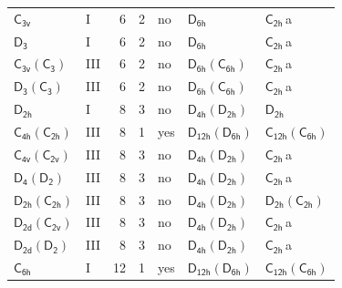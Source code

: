 \documentclass[10pt,a4paper]{article}
\numberwithin{equation}{section}
\newcommand{\grp}[1]{\mathsf{#1}}
\newcommand{\clsletter}[1]{\,{\scriptsize\color{black!55}#1}}
\begin{document}
{\begin{longtable}{@{}llrrlll@{}}
\href{../../../rotation/data/pdf/C3v.pdf}{$\grp{C_{3v}}$} & I & 6 & 2 & no & \href{../../../rotation/data/pdf/D6h.pdf}{$\grp{D_{6h}}$} & \href{../../../rotation/data/pdf/C2h.pdf}{$\grp{C_{2h}}$}\clsletter{a}\\
\href{../../../rotation/data/pdf/D3.pdf}{$\grp{D_{3}}$} & I & 6 & 2 & no & \href{../../../rotation/data/pdf/D6h.pdf}{$\grp{D_{6h}}$} & \href{../../../rotation/data/pdf/C2h.pdf}{$\grp{C_{2h}}$}\clsletter{a}\\
\href{C3v-C3.pdf}{$\grp{C_{3v}}(\grp{C_{3}})$} & III & 6 & 2 & no & \href{D6h-C6h.pdf}{$\grp{D_{6h}}(\grp{C_{6h}})$} & \href{../../../rotation/data/pdf/C2h.pdf}{$\grp{C_{2h}}$}\clsletter{a}\\
\href{D3-C3.pdf}{$\grp{D_{3}}(\grp{C_{3}})$} & III & 6 & 2 & no & \href{D6h-C6h.pdf}{$\grp{D_{6h}}(\grp{C_{6h}})$} & \href{../../../rotation/data/pdf/C2h.pdf}{$\grp{C_{2h}}$}\clsletter{a}\\
\href{../../../rotation/data/pdf/D2h.pdf}{$\grp{D_{2h}}$} & I & 8 & 3 & no & \href{D4h-D2h.pdf}{$\grp{D_{4h}}(\grp{D_{2h}})$} & \href{../../../rotation/data/pdf/D2h.pdf}{$\grp{D_{2h}}$}\\
\href{C4h-C2h.pdf}{$\grp{C_{4h}}(\grp{C_{2h}})$} & III & 8 & 1 & yes & \href{D12h-D6h.pdf}{$\grp{D_{12h}}(\grp{D_{6h}})$} & \href{C12h-C6h.pdf}{$\grp{C_{12h}}(\grp{C_{6h}})$}\\
\href{C4v-C2v.pdf}{$\grp{C_{4v}}(\grp{C_{2v}})$} & III & 8 & 3 & no & \href{D4h-D2h.pdf}{$\grp{D_{4h}}(\grp{D_{2h}})$} & \href{../../../rotation/data/pdf/C2h.pdf}{$\grp{C_{2h}}$}\clsletter{a}\\
\href{D4-D2.pdf}{$\grp{D_{4}}(\grp{D_{2}})$} & III & 8 & 3 & no & \href{D4h-D2h.pdf}{$\grp{D_{4h}}(\grp{D_{2h}})$} & \href{../../../rotation/data/pdf/C2h.pdf}{$\grp{C_{2h}}$}\clsletter{a}\\
\href{D2h-C2h.pdf}{$\grp{D_{2h}}(\grp{C_{2h}})$} & III & 8 & 3 & no & \href{D4h-D2h.pdf}{$\grp{D_{4h}}(\grp{D_{2h}})$} & \href{D2h-C2h.pdf}{$\grp{D_{2h}}(\grp{C_{2h}})$}\\
\href{D2d-C2v.pdf}{$\grp{D_{2d}}(\grp{C_{2v}})$} & III & 8 & 3 & no & \href{D4h-D2h.pdf}{$\grp{D_{4h}}(\grp{D_{2h}})$} & \href{../../../rotation/data/pdf/C2h.pdf}{$\grp{C_{2h}}$}\clsletter{a}\\
\href{D2d-D2.pdf}{$\grp{D_{2d}}(\grp{D_{2}})$} & III & 8 & 3 & no & \href{D4h-D2h.pdf}{$\grp{D_{4h}}(\grp{D_{2h}})$} & \href{../../../rotation/data/pdf/C2h.pdf}{$\grp{C_{2h}}$}\clsletter{a}\\
\href{../../../rotation/data/pdf/C6h.pdf}{$\grp{C_{6h}}$} & I & 12 & 1 & yes & \href{D12h-D6h.pdf}{$\grp{D_{12h}}(\grp{D_{6h}})$} & \href{C12h-C6h.pdf}{$\grp{C_{12h}}(\grp{C_{6h}})$}\\

\end{longtable}}
\end{document}

